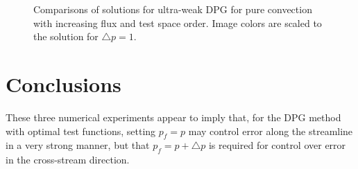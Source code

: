 \documentclass[final,leqno]{siamltex}
\begin{document}
\begin{figure}[!h]
\centering
{}
\caption{Comparisons of solutions for ultra-weak DPG for pure convection with increasing flux and test space order.  Image colors are scaled to the solution for $\triangle p=1$.}
\label{fig:dpg_nondiffuse}
\end{figure}

\section{Conclusions}

These three numerical experiments appear to imply that, for the DPG method with optimal test functions, setting $p_f = p$ may control error along the streamline in a very strong manner, but that $p_f = p+\triangle p$ is required for control over error in the cross-stream direction.  



\end{document}
